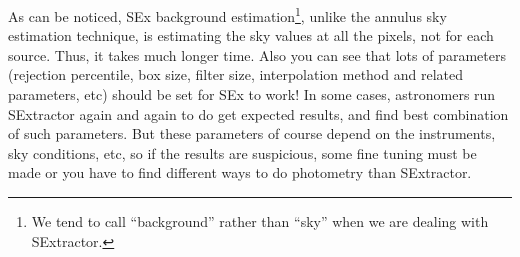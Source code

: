 As can be noticed, SEx background estimation\footnote{We tend to call ``background'' rather than ``sky'' when we are dealing with SExtractor.}, unlike the annulus sky estimation technique, is estimating the sky values at all the pixels, not for each source. Thus, it takes much longer time. Also you can see that lots of parameters (rejection percentile, box size, filter size, interpolation method and related parameters, etc) should be set for SEx to work! In some cases, astronomers run SExtractor again and again to do get expected results, and find best combination of such parameters. But these parameters of course depend on the instruments, sky conditions, etc, so if the results are suspicious, some fine tuning must be made or you have to find different ways to do photometry than SExtractor.


